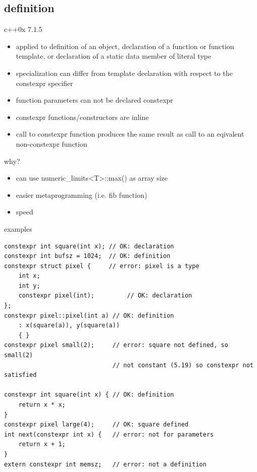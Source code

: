 \documentclass{beamer}
\begin{document}
\subsection{definition}
\begin{frame}{c++0x 7.1.5}
  \begin{block}{}
    \begin{itemize}
    \item applied to definition of an object, declaration of a
      function or function template, or declaration of a static data
      member of literal type
    \item specialization can differ from template declaration with
      respect to the constexpr specifier
    \item function parameters can not be declared constexpr
    \item constexpr functions/constructors are inline
    \item call to constexpr function produces the same result as call
      to an eqivalent non-constexpr function
    \end{itemize}
  \end{block}
\end{frame}

\begin{frame}{why?}
  \begin{block}
    \begin{itemize}
    \item can use numeric\_limits<T>::max() as array size
    \item easier metaprogramming (i.e. fib function)
    \item speed
    \end{itemize}
  \end{block}
\end{frame}

\begin{frame}{examples}
  \begin{block}
\begin{verbatim}
constexpr int square(int x); // OK: declaration
constexpr int bufsz = 1024;  // OK: definition
constexpr struct pixel {     // error: pixel is a type
    int x;
    int y;
    constexpr pixel(int);         // OK: declaration
};
constexpr pixel::pixel(int a) // OK: definition
    : x(square(a)), y(square(a))
    { }
constexpr pixel small(2);     // error: square not defined, so small(2)
                              // not constant (5.19) so constexpr not satisfied

constexpr int square(int x) { // OK: definition
    return x * x;
}
constexpr pixel large(4);     // OK: square defined
int next(constexpr int x) {   // error: not for parameters
    return x + 1;
}
extern constexpr int memsz;   // error: not a definition
\end{verbatim}
  \end{block}
\end{frame}
\end{document}
